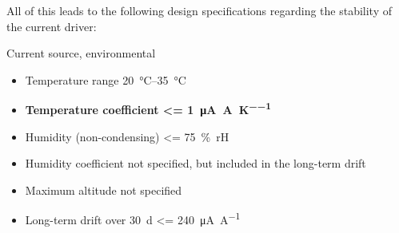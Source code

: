 
All of this leads to the following design specifications regarding the stability of the current driver:
\begin{center}
    \begin{specifications}[label={lst:dgDrive_specs_environment}]{Current source, environmental}
    \begin{itemize}
        \item Temperature range \qtyrange[text-series-to-math, reset-text-series = false, reset-math-version = false, range-phrase=\textup{~to~}]{20}{35}{\celsius}
        \item \textbf{Temperature coefficient \qty[text-series-to-math, reset-text-series = false, reset-math-version = false]{<= 1}{\uA \per \A \per \K}}
        \item Humidity (non-condensing) \qty{<= 75}{\percent rH}
        \item Humidity coefficient not specified, but included in the long-term drift
        \item Maximum altitude not specified
        \item Long-term drift over \qty{30}{\day} \qty{<= 240}{\uA \per \A}
    \end{itemize}
    \end{specifications}
\end{center}


